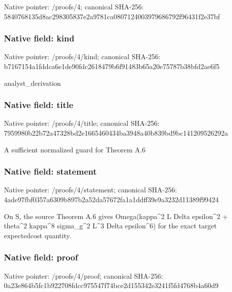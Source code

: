 \documentclass[10pt,a4paper]{article}
\begin{document}
Native pointer: /proofs/4; canonical SHA-256: 5840768135d8ac298305837e\allowbreak{}2a9781ca0807124003979686\allowbreak{}792f96431f2e37bf



\subsubsection{Native field: kind}


Native pointer: /proofs/4/kind; canonical SHA-256: b7167154a1fddca6e1de90fd\allowbreak{}c2618479b6f91483b65a20e7\allowbreak{}5787b38bfd2ae6f5


analyst\_derivation


\subsubsection{Native field: title}


Native pointer: /proofs/4/title; canonical SHA-256: 7959980b22b72a47328bd2e1\allowbreak{}665460434ba3948a40b839bd\allowbreak{}9bc141209526292a


A sufficient normalized guard for Theorem A.6


\subsubsection{Native field: statement}


Native pointer: /proofs/4/statement; canonical SHA-256: 4ade97fbf0357a6309b897b2\allowbreak{}a52da57672fa1a1ddff39e9a\allowbreak{}3232d11389f99424


On S, the source Theorem A.6 gives Omega(kappa\textasciicircum{}2 L Delta epsilon\textasciicircum{}2 + theta\textasciicircum{}2 kappa\textasciicircum{}8 sigma\_g\textasciicircum{}2 L\textasciicircum{}3 Delta epsilon\textasciicircum{}6) for the exact target expectedcost quantity.


\subsubsection{Native field: proof}


Native pointer: /proofs/4/proof; canonical SHA-256: 0a23e864b5fc1b922708fdcc\allowbreak{}975547f74bce2d155342e324\allowbreak{}1f5fd4768b4a60d9
\end{document}
